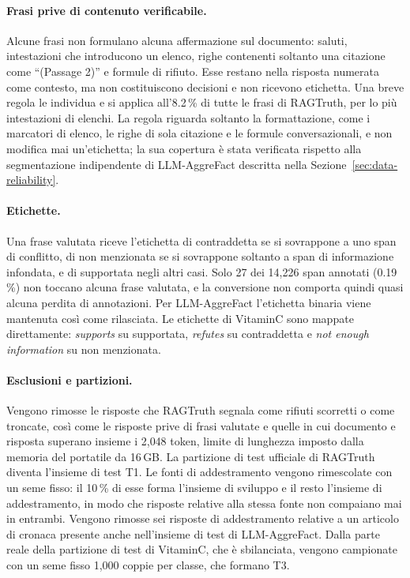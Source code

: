 \paragraph{Frasi prive di contenuto verificabile.} Alcune frasi non formulano alcuna affermazione sul documento: saluti,
intestazioni che introducono un elenco, righe contenenti soltanto una citazione come ``(Passage 2)'' e formule di
rifiuto. Esse restano nella risposta numerata come contesto, ma non costituiscono decisioni e non ricevono etichetta.
Una breve regola le individua e si applica all'8.2\,\% di tutte le frasi di RAGTruth, per lo più intestazioni di
elenchi. La regola riguarda soltanto la formattazione, come i marcatori di elenco, le righe di sola citazione e le
formule conversazionali, e non modifica mai un'etichetta; la sua copertura è stata verificata rispetto alla
segmentazione indipendente di LLM-AggreFact descritta nella Sezione~\ref{sec:data-reliability}.

\paragraph{Etichette.} Una frase valutata riceve l'etichetta di contraddetta se si sovrappone a uno span di conflitto,
di non menzionata se si sovrappone soltanto a span di informazione infondata, e di supportata negli altri casi. Solo 27
dei 14{,}226 span annotati (0.19\,\%) non toccano alcuna frase valutata, e la conversione non comporta quindi quasi
alcuna perdita di annotazioni. Per LLM-AggreFact l'etichetta binaria viene mantenuta così come rilasciata. Le etichette
di VitaminC sono mappate direttamente: \emph{supports} su supportata, \emph{refutes} su contraddetta e \emph{not enough
information} su non menzionata.

\paragraph{Esclusioni e partizioni.} Vengono rimosse le risposte che RAGTruth segnala come rifiuti scorretti o come
troncate, così come le risposte prive di frasi valutate e quelle in cui documento e risposta superano insieme i 2{,}048
token, limite di lunghezza imposto dalla memoria del portatile da 16\,GB. La partizione di test ufficiale di RAGTruth
diventa l'insieme di test T1. Le fonti di addestramento vengono rimescolate con un seme fisso: il 10\,\% di esse forma
l'insieme di sviluppo e il resto l'insieme di addestramento, in modo che risposte relative alla stessa fonte non
compaiano mai in entrambi. Vengono rimosse sei risposte di addestramento relative a un articolo di cronaca presente
anche nell'insieme di test di LLM-AggreFact. Dalla parte reale della partizione di test di VitaminC, che è sbilanciata,
vengono campionate con un seme fisso 1{,}000 coppie per classe, che formano T3.

